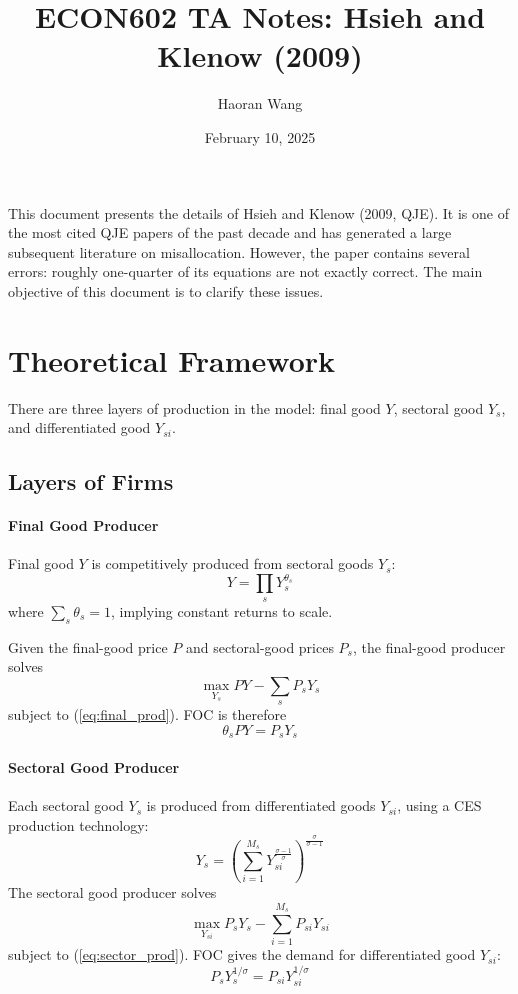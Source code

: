 \documentclass[12pt]{article}
\title{ECON602 TA Notes: Hsieh and Klenow (2009)}
\author{Haoran Wang}
\date{February 10, 2025}
\begin{document}
	
	\maketitle
	
	\tableofcontents
	
		This document presents the details of Hsieh and Klenow (2009, QJE). It is one of the most cited QJE papers of the past decade and has generated a large subsequent literature on misallocation. However, the paper contains several errors: roughly one-quarter of its equations are not exactly correct. The main objective of this document is to clarify these issues.
	
	\section{Theoretical Framework}
	
	There are three layers of production in the model: final good $Y$, sectoral good $Y_s$, and differentiated good $Y_{si}$.
	
	\subsection{Layers of Firms}
	
	\paragraph{Final Good Producer \\ [6pt]}
	Final good $Y$ is competitively produced from sectoral goods $Y_s$:
	\begin{equation} \label{eq:final_prod}
		Y = \prod_{s} Y_s^{\theta_s}
	\end{equation}
		where $\sum_{s} \theta_s = 1$, implying constant returns to scale.
	
		Given the final-good price $P$ and sectoral-good prices $P_s$, the final-good producer solves
	\[\max_{Y_s} PY - \sum_s P_s Y_s\]
	subject to (\ref{eq:final_prod}). FOC is therefore 
	\begin{equation}
		\theta_s PY = P_s Y_s
	\end{equation}
	
	\paragraph{Sectoral Good Producer \\ [6pt]}
	
	Each sectoral good $Y_s$ is produced from differentiated goods $Y_{si}$, using a CES production technology:
	\begin{equation} \label{eq:sector_prod}
		Y_s = \left(\sum_{i=1}^{M_s} Y_{si}^{\frac{\sigma -1}{\sigma}}\right)^{\frac{\sigma}{\sigma-1}}
	\end{equation}
	The sectoral good producer solves
	\[\max_{Y_{si}}P_s Y_s - \sum_{i=1}^{M_s} P_{si} Y_{si}\]
	subject to (\ref{eq:sector_prod}). FOC gives the demand for differentiated good $Y_{si}$:
	\begin{equation} \label{eq:demand_si}
		P_s Y_s^{1/\sigma} = P_{si} Y_{si}^{1/\sigma}
	\end{equation}
	
\end{document}

